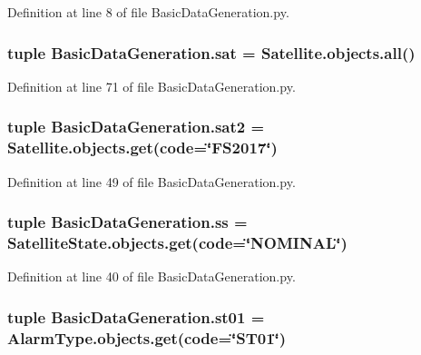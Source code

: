 Definition at line 8 of file Basic\+Data\+Generation.\+py.

\hypertarget{namespace_basic_data_generation_a003ba5cfa9eb1da86b562dac92f713e3}{}
\subsubsection[{sat}]{\setlength{\rightskip}{0pt plus 5cm}tuple Basic\+Data\+Generation.\+sat = Satellite.\+objects.\+all()}\label{namespace_basic_data_generation_a003ba5cfa9eb1da86b562dac92f713e3}


Definition at line 71 of file Basic\+Data\+Generation.\+py.

\hypertarget{namespace_basic_data_generation_a2a7c0a3f11368b069b40d2b26ddfbba5}{}
\subsubsection[{sat2}]{\setlength{\rightskip}{0pt plus 5cm}tuple Basic\+Data\+Generation.\+sat2 = Satellite.\+objects.\+get(code=\char`\"{}F\+S2017\char`\"{})}\label{namespace_basic_data_generation_a2a7c0a3f11368b069b40d2b26ddfbba5}


Definition at line 49 of file Basic\+Data\+Generation.\+py.

\hypertarget{namespace_basic_data_generation_a9429db321b2f5b7b76b129c7cedc9631}{}
\subsubsection[{ss}]{\setlength{\rightskip}{0pt plus 5cm}tuple Basic\+Data\+Generation.\+ss = Satellite\+State.\+objects.\+get(code=\char`\"{}N\+O\+M\+I\+N\+A\+L\char`\"{})}\label{namespace_basic_data_generation_a9429db321b2f5b7b76b129c7cedc9631}


Definition at line 40 of file Basic\+Data\+Generation.\+py.

\hypertarget{namespace_basic_data_generation_a51c41b982f7370bb0c9037d6d1e60464}{}
\subsubsection[{st01}]{\setlength{\rightskip}{0pt plus 5cm}tuple Basic\+Data\+Generation.\+st01 = Alarm\+Type.\+objects.\+get(code=\char`\"{}S\+T01\char`\"{})}\label{namespace_basic_data_generation_a51c41b982f7370bb0c9037d6d1e60464}


